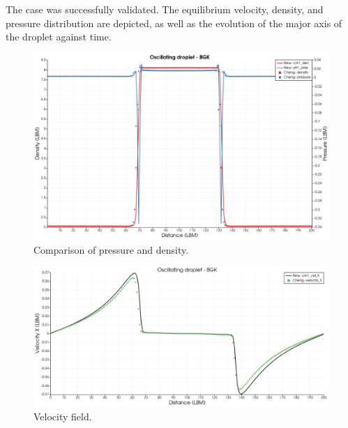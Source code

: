 \documentclass{article}
\begin{document}
	The case was successfully validated. The equilibrium velocity, density, and pressure distribution are depicted, as well as the evolution of the major axis of the droplet against time.
	\begin{figure}[h]
		\centering
		\includegraphics[scale=0.3]{pics/BGK_OscDroplet_PRHO.png}
		\caption{Comparison of pressure and density.}
		\label{fig:val1CBGK_Osc1}
	\end{figure}
	\begin{figure}[h]
		\centering
		\includegraphics[scale=0.3]{pics/BGK_OscDroplet_VelProf.png}
		\caption{Velocity field.}
		\label{fig:val1CBGK_Osc3}
	\end{figure}
\end{document}
